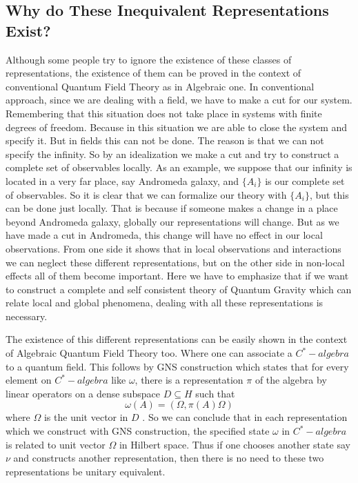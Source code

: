 \documentclass[12pt,a4paper]{article}
\begin{document}
\subsection{Why do These Inequivalent Representations Exist?}\label{subsection.why UIR exist}
Although some people try to ignore the existence of these classes of representations, the existence of them can be proved in the context of conventional Quantum Field Theory as in Algebraic one.
In conventional approach, since we are dealing with a field, we have to make a cut for our system. Remembering that this situation does not take place in systems with finite degrees of freedom. Because in this situation we are able to close the system and specify it. But in fields this can not be done. The reason is that we can not specify the infinity. So by an idealization we make a cut and try to construct a complete set of observables locally. As an example, we suppose that our infinity is located in a very far place, say Andromeda galaxy, and ${\{A_{i}\}}$ is our complete set of observables. So it is clear that we can formalize our theory with ${\{A_{i}\}}$, but this can be done just locally. That is because if someone makes a change in a place beyond Andromeda galaxy, globally our representations will change. But as we have made a cut in Andromeda, this change will have no effect in our local observations. From one side it shows that in local observations and interactions we can neglect these different representations, but on the other side in non-local effects all of them become important. Here we have to emphasize that if we want to construct a complete and self consistent theory of Quantum Gravity which can relate local and global phenomena, dealing with all these representations is necessary.

The existence of this different representations can be easily shown in the context of Algebraic Quantum Field Theory too. Where one can associate a $ C^*-algebra $ to a quantum field. This follows by GNS construction \cite{citeulike:7477863,Segal} which states that for every element on $ C^*-algebra $ like $\omega$, there is a representation $\pi$ of the algebra by linear operators on a dense subspace $D\subseteq H$ such that
\begin{equation}\label{eqn.GNS}
\omega(A)=(\Omega,\pi(A)\Omega)
\end{equation}
where $\Omega$ is the unit vector in $D$ .
So we can conclude that in each representation which we construct with GNS construction, the specified state $\omega$ in $ C^*-algebra $ is related to unit vector $\Omega$ in Hilbert space. Thus if one chooses another state say $\nu$ and constructs another representation, then there is no need to these two representations be unitary equivalent.
\end{document}
